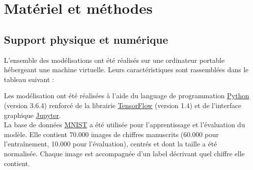 
\chapter{Matériel et méthodes} %
\label{Materiel_methode} %


\section{Support physique et numérique} %
L'ensemble des modélisations ont été réalisés sur une ordinateur portable hébergeant une machine virtuelle. Leurs caractéristiques sont rassemblées dans le tableau suivant :\\


Les modélisation ont été réalisées à l'aide du language de programmation \href{https://www.python.org/}{Python} (version 3.6.4) renforcé de la librairie \href{https://www.tensorflow.org/}{TensorFlow} (version 1.4) et de l'interface graphique \href{https://jupyter.org/}{Jupyter}.\\
La base de données \href{http://yann.lecun.com/exdb/mnist/}{MNIST} a été utilisée pour l'apprentissage et l'évaluation du modèle. Elle contient 70.000 images de chiffres manuscrits (60.000 pour l'entraînement, 10.000 pour l'évaluation), centrés et dont la taille a été normalisée. Chaque image est accompagnée d'un label décrivant quel chiffre elle contient.



